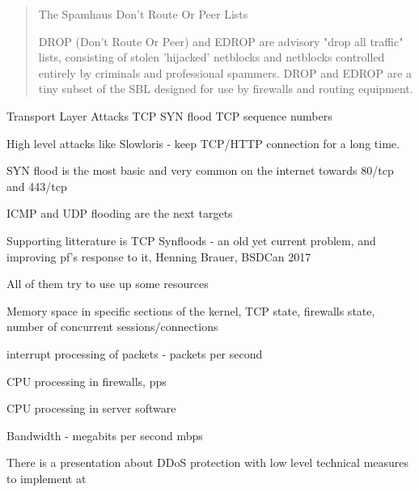 \documentclass[Screen16to9,17pt]{foils}
\begin{document}

\begin{quote}
The Spamhaus Don't Route Or Peer Lists

DROP (Don't Route Or Peer) and EDROP are advisory "drop all traffic" lists, consisting of stolen 'hijacked' netblocks and netblocks controlled entirely by criminals and professional spammers. DROP and EDROP are a tiny subset of the SBL designed for use by firewalls and routing equipment.
\end{quote}





\begin{list2}
\item Transport Layer Attacks TCP SYN flood TCP sequence numbers
\item High level attacks like Slowloris - keep TCP/HTTP connection for a long time.
\end{list2}



\begin{list2}
\item SYN flood is the most basic and very common on the internet towards 80/tcp and 443/tcp
\item ICMP and UDP flooding are the next targets
\item Supporting litterature is TCP Synfloods - an old yet current problem, and improving pf's response to it, Henning Brauer, BSDCan 2017
\item All of them try to use up some resources
\begin{list2}
\item Memory space in specific sections of the kernel, TCP state, firewalls state, number of concurrent sessions/connections
\item interrupt processing of packets - packets per second
\item CPU processing in firewalls, pps
\item CPU processing in server software
\item Bandwidth - megabits per second mbps
\end{list2}
\end{list2}

There is a presentation about DDoS protection with low level technical measures to implement at\\
{\footnotesize {}}
\end{document}
